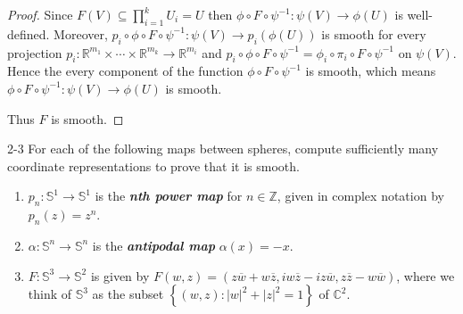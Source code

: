 \begin{proof}
    Since \( F(V) \subseteq \prod_{i=1}^{k} U_{i} = U \) then \( \phi \circ F \circ \psi^{-1}: \psi(V) \to \phi(U) \) is well-defined. Moreover, \( p_{i} \circ \phi \circ F \circ \psi^{-1}: \psi(V) \to p_{i}(\phi(U)) \) is smooth for every projection \( p_{i}: \mathbb{R}^{m_{1}} \times \cdots \times \mathbb{R}^{m_{k}} \to \mathbb{R}^{m_{i}} \) and \( p_{i} \circ \phi \circ F \circ \psi^{-1} = \phi_{i} \circ \pi_{i} \circ F \circ \psi^{-1} \) on \( \psi(V) \). Hence the every component of the function \( \phi \circ F \circ \psi^{-1} \) is smooth, which means \( \phi \circ F \circ \psi^{-1}: \psi(V) \to \phi(U) \) is smooth.

    Thus \( F \) is smooth.
\end{proof}

\begin{problem}{2-3}
    For each of the following maps between spheres, compute sufficiently many
    coordinate representations to prove that it is smooth.
    \begin{enumerate}[itemsep=0pt,label={(\alph*)}]
        \item \( p_{n}: \mathbb{S}^{1} \to \mathbb{S}^{1} \) is the \textbf{\emph{nth power map}} for \( n \in \mathbb{Z} \), given in complex notation by \( p_{n}(z) = z^{n} \).
        \item \( \alpha: \mathbb{S}^{n} \to \mathbb{S}^{n} \) is the \textbf{\emph{antipodal map}} \( \alpha(x) = -x \).
        \item \( F: \mathbb{S}^{3} \to \mathbb{S}^{2} \) is given by \( F(w, z) = (z\overline{w} + w\overline{z}, i w\overline{z} - i z\overline{w}, z\overline{z} - w\overline{w}) \), where we think of \( \mathbb{S}^{3} \) as the subset \( \left\{ (w, z) : {\left\vert w \right\vert}^{2} + {\left\vert z \right\vert}^{2} = 1 \right\} \) of \( \mathbb{C}^{2} \).
    \end{enumerate}
\end{problem}

